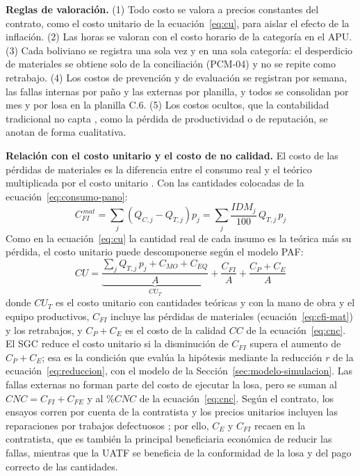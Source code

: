 \vspace{-6pt}
\endgroup

\textbf{Reglas de valoración.} (1) Todo costo se valora a precios constantes del contrato, como el costo unitario de la ecuación~\eqref{eq:cu}, para aislar el efecto de la inflación. (2) Las horas se valoran con el costo horario de la categoría en el APU. (3) Cada boliviano se registra una sola vez y en una sola categoría: el desperdicio de materiales se obtiene solo de la conciliación (PCM-04) y no se repite como retrabajo. (4) Los costos de prevención y de evaluación se registran por semana, las fallas internas por paño y las externas por planilla, y todos se consolidan por mes y por losa en la planilla C.6. (5) Los costos ocultos, que la contabilidad tradicional no capta \parencite[p.~5403]{khadim2023}, como la pérdida de productividad o de reputación, se anotan de forma cualitativa.

\textbf{Relación con el costo unitario y el costo de no calidad.} El costo de las pérdidas de materiales es la diferencia entre el consumo real y el teórico multiplicada por el costo unitario \parencite[tabla~2]{rossi2001}. Con las cantidades colocadas de la ecuación~\eqref{eq:consumo-pano}:
\begin{equation}
  C_{FI}^{\,mat} = \sum_{j} \left( Q_{C,j} - Q_{T,j} \right) p_j = \sum_{j} \frac{IDM_j}{100}\, Q_{T,j}\, p_j
  \label{eq:cfi-mat}
\end{equation}
Como en la ecuación~\eqref{eq:cu} la cantidad real de cada insumo es la teórica más su pérdida, el costo unitario puede descomponerse según el modelo PAF:
\begin{equation}
  CU = \underbrace{\frac{\sum_{j} Q_{T,j}\, p_j + C_{MO} + C_{EQ}}{A}}_{CU_T} + \frac{C_{FI}}{A} + \frac{C_P + C_E}{A}
  \label{eq:cu-paf}
\end{equation}
donde $CU_T$ es el costo unitario con cantidades teóricas y con la mano de obra y el equipo productivos, $C_{FI}$ incluye las pérdidas de materiales (ecuación~\ref{eq:cfi-mat}) y los retrabajos, y $C_P + C_E$ es el costo de la calidad $CC$ de la ecuación~\eqref{eq:cnc}. El SGC reduce el costo unitario si la disminución de $C_{FI}$ supera el aumento de $C_P + C_E$; esa es la condición que evalúa la hipótesis mediante la reducción $r$ de la ecuación~\eqref{eq:reduccion}, con el modelo de la Sección~\ref{sec:modelo-simulacion}. Las fallas externas no forman parte del costo de ejecutar la losa, pero se suman al $CNC = C_{FI} + C_{FE}$ y al $\%CNC$ de la ecuación~\eqref{eq:cnc}. Según el contrato, los ensayos corren por cuenta de la contratista y los precios unitarios incluyen las reparaciones por trabajos defectuosos \parencite[pp.~92, 102]{uatf2025pao2}; por ello, $C_E$ y $C_{FI}$ recaen en la contratista, que es también la principal beneficiaria económica de reducir las fallas, mientras que la UATF se beneficia de la conformidad de la losa y del pago correcto de las cantidades.


